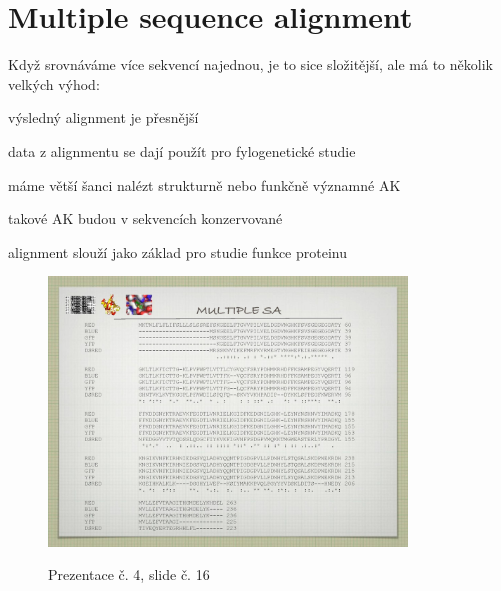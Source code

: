 \documentclass[DIV=8]{scrreprt}
\begin{document}
\section{Multiple sequence alignment} \label{Multiple sequence alignment} \FloatBarrier


Když srovnáváme více sekvencí najednou, je to sice složitější, ale má to několik velkých výhod:
\begin{myEnumerate}[nosep]
    \item výsledný alignment je přesnější
    \item data z alignmentu se dají použít pro fylogenetické studie
    \item máme větší šanci nalézt strukturně nebo funkčně významné AK
\begin{myItemize}[nosep]
    \item takové AK budou v sekvencích konzervované
\end{myItemize}

    \item alignment slouží jako základ pro studie funkce proteinu
\end{myEnumerate}



\begin{figure}
    \caption{Prezentace č. 4, slide č. 16}
    \includegraphics[width=0.85\textwidth]{slides-4/slide-16.jpg}
    \centering
    \label{slides-4-slide-16}
\end{figure}
\end{document}
